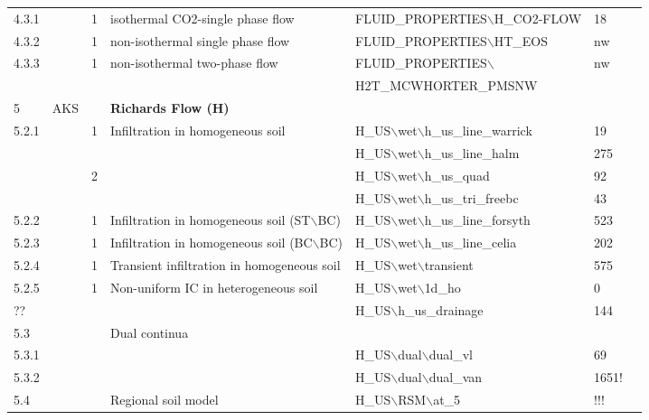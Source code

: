 \begin{landscape}
\begin{center}
\begin{tabularx}{\linewidth}{lllXXll}
4.3.1&&         1&      isothermal CO2-single phase flow&FLUID\_PROPERTIES$\backslash$H\_CO2-FLOW&18&\\
4.3.2&&         1&      non-isothermal single phase flow&FLUID\_PROPERTIES$\backslash$HT\_EOS&nw&\\
4.3.3&&         1&      non-isothermal two-phase flow&FLUID\_PROPERTIES$\backslash$&nw&\\
&&&&H2T\_MCWHORTER\_PMSNW&&\\
\midrule

5&AKS&&\textbf{Richards Flow (H)} &&&\\
5.2.1&&         1&      Infiltration in homogeneous soil&       H\_US$\backslash$wet$\backslash$h\_us\_line\_warrick&19&\\
                 &&                                                                                                                                                      &&H\_US$\backslash$wet$\backslash$h\_us\_line\_halm&275&\\
                 &&2                                                                                                                                             &&H\_US$\backslash$wet$\backslash$h\_us\_quad&92&\\  
                 &&&                                                                                                                                    &H\_US$\backslash$wet$\backslash$h\_us\_tri\_freebc&43&\\    
5.2.2&&         1&      Infiltration in homogeneous soil (ST$\backslash$BC)&    H\_US$\backslash$wet$\backslash$h\_us\_line\_forsyth &523&\\
5.2.3&&         1&      Infiltration in homogeneous soil (BC$\backslash$BC)&    H\_US$\backslash$wet$\backslash$h\_us\_line\_celia&202&\\
5.2.4&&         1&      Transient infiltration in homogeneous soil&     H\_US$\backslash$wet$\backslash$transient&575&\\
5.2.5&&         1&      Non-uniform IC in heterogeneous soil&   H\_US$\backslash$wet$\backslash$1d\_ho&0&\\
??       &&              &                                                                                                                                                      & H\_US$\backslash$h\_us\_drainage&144&\\
5.3  &&          &Dual continua&&&\\
5.3.1&&          &                                      & H\_US$\backslash$dual$\backslash$dual\_vl&69&\\
5.3.2&&          &                                      & H\_US$\backslash$dual$\backslash$dual\_van&1651!&\\
5.4  &&    &Regional soil model                   &     H\_US$\backslash$RSM$\backslash$at\_5&!!!&\\ 
\midrule


\end{tabularx}
\end{center}
\end{landscape}
